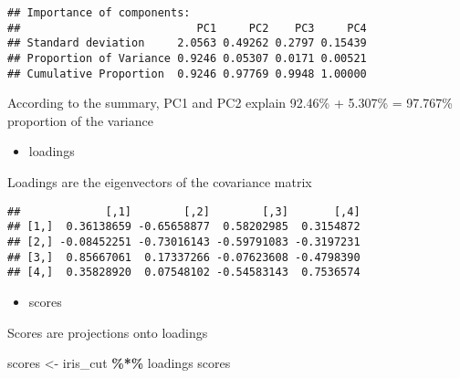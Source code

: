 \documentclass[
]{article}
\newenvironment{Shaded}{\begin{snugshade}}{\end{snugshade}}
\newcommand{\CommentTok}[1]{\textcolor[rgb]{0.56,0.35,0.01}{\textit{#1}}}
\newcommand{\FunctionTok}[1]{\textcolor[rgb]{0.13,0.29,0.53}{\textbf{#1}}}
\newcommand{\NormalTok}[1]{#1}
\newcommand{\OtherTok}[1]{\textcolor[rgb]{0.56,0.35,0.01}{#1}}
\newcommand{\SpecialCharTok}[1]{\textcolor[rgb]{0.81,0.36,0.00}{\textbf{#1}}}
\providecommand{\tightlist}{%
  \setlength{\itemsep}{0pt}\setlength{\parskip}{0pt}}
\begin{document}
\begin{verbatim}
## Importance of components:
##                           PC1     PC2    PC3     PC4
## Standard deviation     2.0563 0.49262 0.2797 0.15439
## Proportion of Variance 0.9246 0.05307 0.0171 0.00521
## Cumulative Proportion  0.9246 0.97769 0.9948 1.00000
\end{verbatim}

According to the summary, PC1 and PC2 explain 92.46\% + 5.307\% =
97.767\% proportion of the variance

\begin{itemize}
\tightlist
\item
  loadings
\end{itemize}

Loadings are the eigenvectors of the covariance matrix

\begin{Shaded}
\end{Shaded}

\begin{verbatim}
##             [,1]        [,2]        [,3]       [,4]
## [1,]  0.36138659 -0.65658877  0.58202985  0.3154872
## [2,] -0.08452251 -0.73016143 -0.59791083 -0.3197231
## [3,]  0.85667061  0.17337266 -0.07623608 -0.4798390
## [4,]  0.35828920  0.07548102 -0.54583143  0.7536574
\end{verbatim}

\begin{itemize}
\tightlist
\item
  scores
\end{itemize}

Scores are projections onto loadings

\begin{Shaded}
\begin{Highlighting}[]
\NormalTok{scores }\OtherTok{\textless{}{-}}\NormalTok{ iris\_cut }\SpecialCharTok{\%*\%}\NormalTok{ loadings}
\NormalTok{scores}
\end{Highlighting}
\end{Shaded}
\end{document}
